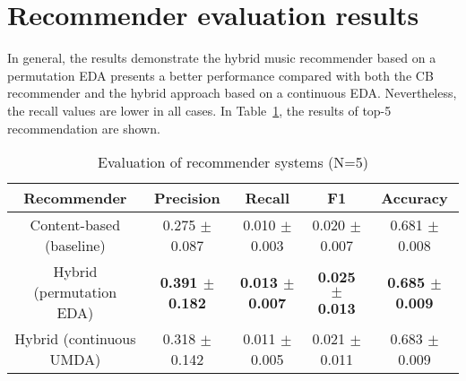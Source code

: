 \section{Recommender evaluation results}
\label{sec:recresults}
In general, the results demonstrate the hybrid music recommender based on a permutation EDA presents a better performance compared with both the CB recommender and the hybrid approach based on a continuous EDA. Nevertheless, the recall values are lower in all cases. In Table~\ref{table:recn5}, the results of top-5 recommendation are shown.
\begin{table}[h!]
	\caption{Evaluation of recommender systems (N=5)} %
	\centering %
	\begin{adjustbox}{max width=\textwidth}
	\begin{tabular}{c c c c c} %
		\hline\hline %
		Recommender & Precision & Recall & F1 & Accuracy \\ [0.5ex] %
		\hline %
		Content-based (baseline) & 0.275 $\pm$ 0.087 & 0.010 $\pm$ 0.003 & 0.020 $\pm$ 0.007 & 0.681 $\pm$ 0.008 \\ %
		Hybrid (permutation EDA) & \textbf{0.391 $\pm$ 0.182} & \textbf{0.013 $\pm$ 0.007} & \textbf{0.025 $\pm$ 0.013} & \textbf{0.685 $\pm$ 0.009} \\
		Hybrid (continuous UMDA) & 0.318 $\pm$ 0.142 & 0.011 $\pm$ 0.005 & 0.021 $\pm$ 0.011 & 0.683 $\pm$ 0.009 \\ [1ex] %
		\hline %
	\end{tabular}
	\end{adjustbox}
	\label{table:recn5} %
\end{table}

